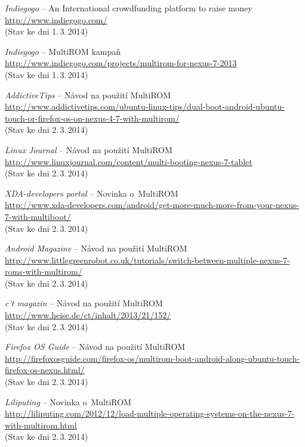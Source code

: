 \documentclass[12pt, a4paper, oneside]{article}
\newcommand{\It}{\textit}  %
\begin{document}
\begin{thebibliography}{99}
     \It{Indiegogo} -- An International crowdfunding platform to raise money\\
    \url{http://www.indiegogo.com/}\\
    (Stav ke dni 1.\,3.\,2014)

     \It{Indiegogo} -- MultiROM kampaň\\
    \url{http://www.indiegogo.com/projects/multirom-for-nexus-7-2013}\\
    (Stav ke dni 1.\,3.\,2014)

     \It{AddictiveTips} -- Návod na použití MultiROM\\
    \url{http://www.addictivetips.com/ubuntu-linux-tips/dual-boot-android-ubuntu-touch-or-firefox-os-on-nexus-4-7-with-multirom/}\\
    (Stav ke dni 2.\,3.\,2014)

     \It{Linux Journal} -- Návod na použití MultiROM\\
    \url{http://www.linuxjournal.com/content/multi-booting-nexus-7-tablet}\\
    (Stav ke dni 2.\,3.\,2014)

     \It{XDA-developers portal} -- Novinka o~MultiROM\\
    \url{http://www.xda-developers.com/android/get-more-much-more-from-your-nexus-7-with-multiboot/}\\
    (Stav ke dni 2.\,3.\,2014)

     \It{Android Magazine} -- Návod na použití MultiROM\\
    \url{http://www.littlegreenrobot.co.uk/tutorials/switch-between-multiple-nexus-7-roms-with-multirom/}\\
    (Stav ke dni 2.\,3.\,2014)

     \It{c't magazin} -- Návod na použití MultiROM\\
    \url{http://www.heise.de/ct/inhalt/2013/21/152/}\\
    (Stav ke dni 2.\,3.\,2014)

     \It{Firefox OS Guide} -- Návod na použití MultiROM\\
    \url{http://firefoxosguide.com/firefox-os/multirom-boot-android-along-ubuntu-touch-firefox-os-nexus.html/}\\
    (Stav ke dni 2.\,3.\,2014)

     \It{Liliputing} -- Novinka o~MultiROM\\
    \url{http://liliputing.com/2012/12/load-multiple-operating-systems-on-the-nexus-7-with-multirom.html}\\
    (Stav ke dni 2.\,3.\,2014)


\end{thebibliography}
\end{document}
